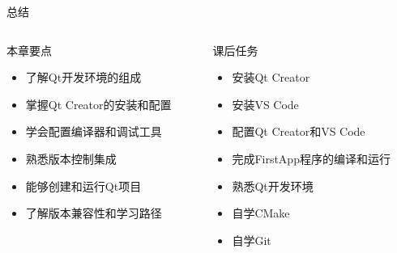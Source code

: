 \documentclass[UTF8,aspectratio=169]{beamer}
\begin{document}
\begin{frame}{总结}
    \begin{columns}
        \begin{column}{0.48\textwidth}
            \begin{ytublock}{本章要点}
                \begin{itemize}
                    \item 了解Qt开发环境的组成
                    \item 掌握Qt Creator的安装和配置
                    \item 学会配置编译器和调试工具
                    \item 熟悉版本控制集成
                    \item 能够创建和运行Qt项目
                    \item 了解版本兼容性和学习路径
                \end{itemize}
            \end{ytublock}
        \end{column}
        \hspace{0.02\textwidth}
        \begin{column}{0.48\textwidth}
            \begin{ytublock}{课后任务}
                \begin{itemize}
                    \item 安装Qt Creator
                    \item 安装VS Code
                    \item 配置Qt Creator和VS Code
                    \item 完成FirstApp程序的编译和运行
                    \item 熟悉Qt开发环境
                    \item 自学CMake
                    \item 自学Git
                \end{itemize}
            \end{ytublock}
        \end{column}
    \end{columns}
\end{frame}
\end{document}
